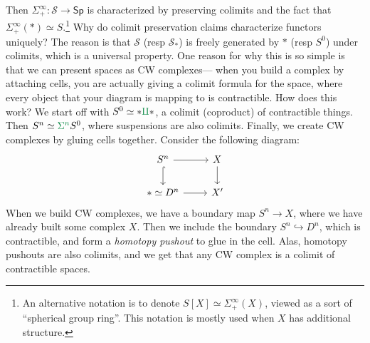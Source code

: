 Then $\Sigma ^{\infty}_+ \colon \mathcal{S}  \to \mathsf{Sp} $ is characterized by preserving colimits and the fact that $\Sigma ^{\infty}_+ (*)\simeq S$.\footnote{An alternative notation is to denote $S[X]\simeq \Sigma ^{\infty}_+(X)$, viewed as a sort of ``spherical group ring''. This notation is mostly used when $X$ has additional structure.} Why do colimit preservation claims characterize functors uniquely? The reason is that $\mathcal{S} $ (resp $\mathcal{S} _*$) is freely generated by $*$ (resp $S^0$) under colimits, which is a universal property. One reason for why this is so simple is that we can present spaces as CW complexes--- when you build a complex by attaching cells, you are actually giving a colimit formula for the space, where every object that your diagram is mapping to is contractible. How does this work? We start off with $S^0 \simeq * {\color{meangreen}\amalg } *$, a {\color{meangreen}colimit} (coproduct) of contractible things. Then $S^n \simeq {\color{meangreen}\Sigma ^n} S^0$, where suspensions are also {\color{meangreen}colimits}. Finally, we create CW complexes by gluing cells together. Consider the following diagram: \[
\begin{tikzcd}
    S^n \arrow[r]\arrow[d,hook] & X \arrow[d] \\
    *\simeq D^n \arrow[r] & X'
\end{tikzcd}
\] When we build CW complexes, we have a boundary map $S^n \to X$, where we have already built some complex $X$. Then we include the boundary $S^n  \hookrightarrow D^n $, which is contractible, and form a \emph{homotopy pushout} to glue in the cell. Alas, homotopy pushouts are also {\color{meangreen}colimits}, and we get that any CW complex is a colimit of contractible spaces.
\orbreak


